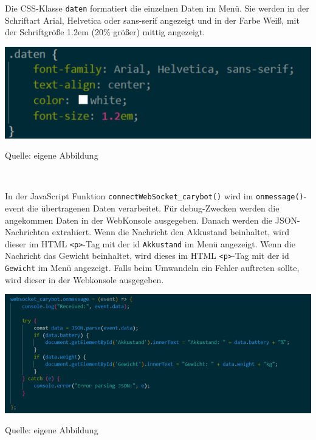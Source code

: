 \documentclass[ngerman,12pt,a4paper]{article}
\begin{document}
	Die CSS-Klasse \texttt{daten} formatiert die einzelnen Daten im Menü. Sie werden in der Schriftart Arial, Helvetica oder sans-serif angezeigt und in der Farbe Weiß, mit der Schriftgröße 1.2em (20\% größer) mittig angezeigt. \\[0.5cm]
	\begin{center}
		\begin{minipage}[t]{0.85\textwidth}
			\includegraphics[scale=0.9]{Pictures/daten-css}
			\label{fig:sensordaten-daten}
			\vspace{-10pt}
			\begin{center}
				\par\small Quelle: eigene Abbildung 
			\end{center}
		\end{minipage} \\[0.75cm]
	\end{center}
	In der JavaScript Funktion \texttt{connectWebSocket\_carybot()} wird im \texttt{onmessage()}-event die übertragenen Daten verarbeitet. Für debug-Zwecken werden die angekommen Daten in der WebKonsole ausgegeben. Danach werden die JSON-Nachrichten extrahiert. Wenn die Nachricht den Akkustand beinhaltet, wird dieser im HTML \texttt{<p>}-Tag mit der id \texttt{Akkustand} im Menü angezeigt. Wenn die Nachricht das Gewicht beinhaltet, wird dieses im HTML \texttt{<p>}-Tag mit der id \texttt{Gewicht} im Menü angezeigt. Falls beim Umwandeln ein Fehler auftreten sollte, wird dieser in der Webkonsole ausgegeben. \\
	\begin{center}
		\begin{minipage}[t]{1\textwidth}
			\includegraphics[scale=0.8]{Pictures/sensordaten-js}
			\label{fig:sensordaten-js}
			\vspace{-10pt}
			\begin{center}
				\par\small Quelle: eigene Abbildung 
			\end{center}
		\end{minipage} \\[0.75cm]
	\end{center}
	
\end{document}
